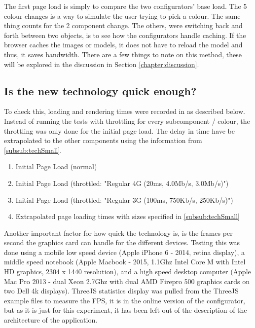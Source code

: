 The first page load is simply to compare the two configurators' base load. The 5 colour changes is a way to simulate the user trying to pick a colour. The same thing counts for the 2 component change. The others, were switching back and forth between two objects, is to see how the configurators handle caching. If the browser caches the images or models, it does not have to reload the model and thus, it saves bandwidth.
There are a few things to note on this method, these will be explored in the discussion in Section \ref{chapter:discussion}.


\subsection{Is the new technology quick enough?}
To check this, loading and rendering times were recorded in as described below. Instead of running the tests with throttling for every subcomponent / colour, the throttling was only done for the initial page load. The delay in time have be extrapolated to the other components using the information from \ref{subsub:techSmall}.
​\begin{enumerate}
\item {Initial Page Load (normal)}
\item {Initial Page Load (throttled: "Regular 4G (20ms, 4.0Mb/s, 3.0Mb/s)")}
\item {Initial Page Load (throttled: "Regular 3G (100ms, 750Kb/s, 250Kb/s)")}
\item {Extrapolated page loading times with sizes specified in \ref{subsub:techSmall}}
\end{enumerate}

Another important factor for how quick the technology is, is the frames per second the graphics card can handle for the different devices. Testing this was done using a mobile low speed device (Apple iPhone 6 - 2014, retina display), a middle speed notebook (Apple Macbook - 2015, 1.1Ghz Intel Core M with Intel HD graphics, 2304 x 1440 resolution), and a high speed desktop computer (Apple Mac Pro 2013 - dual Xeon 2.7Ghz with dual AMD Firepro 500 graphics cards on two Dell 4k displays). ThreeJS statistics display was pulled from the ThreeJS example files to measure the FPS, it is in the online version of the configurator, but as it is just for this experiment, it has been left out of the description of the architecture of the application.

